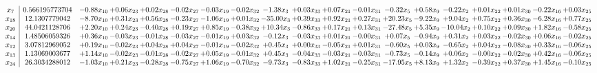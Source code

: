 \documentclass[9pt]{article}
\begin{document}
 \[\begin{array}{c| c c@{\hskip 2pt} c@{\hskip 2pt} c@{\hskip 2pt} c@{\hskip 2pt} c@{\hskip 2pt} c@{\hskip 2pt} c@{\hskip 2pt} c@{\hskip 2pt} c@{\hskip 2pt} c@{\hskip 2pt} c@{\hskip 2pt} c@{\hskip 2pt} c@{\hskip 2pt} c@{\hskip 2pt} c@{\hskip 2pt} c@{\hskip 2pt} c@{\hskip 2pt} }
 x_{7}   &  0.566195773704 & -0.88 x_{10} & +  0.06 x_{23} & +  0.02 x_{28} & -0.02 x_{27} & -0.03 x_{19} & -0.02 x_{32} & -1.38 x_{3} & +  0.03 x_{33} & +  0.07 x_{21} & -0.01 x_{31} & -0.32 x_{5} & +  0.58 x_{9} & -0.22 x_{2} & +  0.01 x_{22} & +  0.01 x_{30} & -0.22 x_{16} & +  0.03 x_{25}\\
 x_{18}   &  12.1307779042 & -8.70 x_{10} & +  0.31 x_{23} & +  0.56 x_{28} & -0.23 x_{27} & -1.06 x_{19} & +  0.01 x_{32} & -35.00 x_{3} & +  0.39 x_{33} & +  0.92 x_{21} & +  0.27 x_{31} & + 20.23 x_{5} & -9.22 x_{9} & +  9.04 x_{2} & +  0.75 x_{22} & +  0.36 x_{30} & -6.28 x_{16} & +  0.77 x_{25}\\
 x_{20}   &  44.0421128706 & +  2.20 x_{10} & +  0.24 x_{23} & -0.40 x_{28} & +  0.19 x_{27} & +  0.85 x_{19} & -0.38 x_{32} & + 10.34 x_{3} & -0.86 x_{33} & +  0.17 x_{21} & +  0.13 x_{31} & -27.48 x_{5} & +  5.35 x_{9} & -10.04 x_{2} & +  0.10 x_{22} & +  0.09 x_{30} & +  1.82 x_{16} & -0.58 x_{25}\\
 x_{14}   &  1.48506059326 & +  0.36 x_{10} & -0.03 x_{23} & -0.01 x_{28} & -0.03 x_{27} & -0.01 x_{19} & +  0.03 x_{32} & -0.12 x_{3} & -0.03 x_{33} & +  0.01 x_{21} & -0.00 x_{31} & +  0.07 x_{5} & -0.94 x_{9} & +  0.31 x_{2} & +  0.03 x_{22} & -0.02 x_{30} & +  0.06 x_{16} & -0.02 x_{25}\\
 x_{12}   &  3.07812969052 & +  0.19 x_{10} & -0.02 x_{23} & +  0.04 x_{28} & +  0.04 x_{27} & -0.01 x_{19} & -0.02 x_{32} & +  0.45 x_{3} & +  0.00 x_{33} & -0.05 x_{21} & +  0.01 x_{31} & -0.60 x_{5} & +  0.03 x_{9} & -0.65 x_{2} & +  0.04 x_{22} & -0.08 x_{30} & +  0.33 x_{16} & -0.06 x_{25}\\
 x_{13}   &  1.13069003677 & +  1.14 x_{10} & -0.02 x_{23} & -0.01 x_{28} & -0.02 x_{27} & +  0.05 x_{19} & -0.01 x_{32} & +  0.45 x_{3} & -0.04 x_{33} & -0.03 x_{21} & -0.03 x_{31} & -0.73 x_{5} & -0.14 x_{9} & +  0.06 x_{2} & -0.00 x_{22} & -0.02 x_{30} & +  0.42 x_{16} & -0.06 x_{25}\\
 x_{24}   &  26.3034288012 & -1.03 x_{10} & +  0.21 x_{23} & -0.28 x_{28} & -0.75 x_{27} & +  1.06 x_{19} & -0.70 x_{32} & -9.73 x_{3} & -0.83 x_{33} & +  1.02 x_{21} & -0.25 x_{31} & -17.95 x_{5} & +  8.13 x_{9} & +  1.32 x_{2} & -0.39 x_{22} & +  0.37 x_{30} & +  1.45 x_{16} & -0.10 x_{25}\\

\end{array}\]
\end{document}
